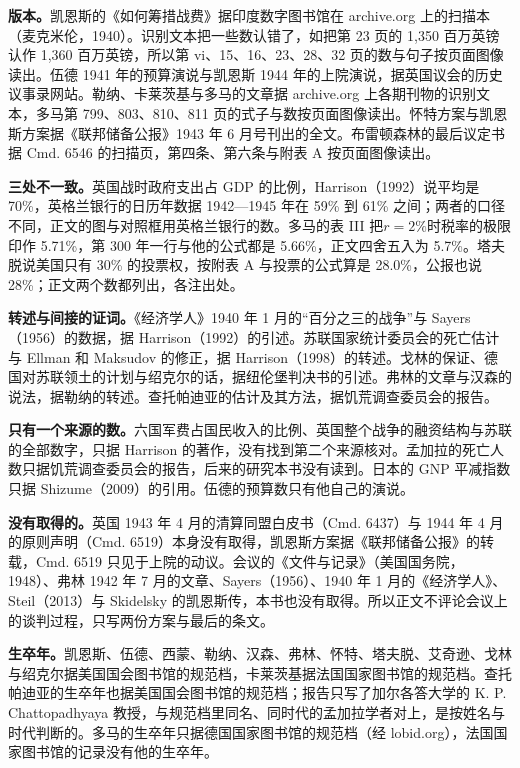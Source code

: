 \begin{deeper}[史料说明]
\textbf{版本。}凯恩斯的《如何筹措战费》据印度数字图书馆在 archive.org 上的扫描本（麦克米伦，1940）。识别文本把一些数认错了，如把第 23 页的 1,350 百万英镑认作 1,360 百万英镑，所以第 vi、15、16、23、28、32 页的数与句子按页面图像读出。伍德 1941 年的预算演说与凯恩斯 1944 年的上院演说，据英国议会的历史议事录网站。勒纳、卡莱茨基与多马的文章据 archive.org 上各期刊物的识别文本，多马第 799、803、810、811 页的式子与数按页面图像读出。怀特方案与凯恩斯方案据《联邦储备公报》1943 年 6 月号刊出的全文。布雷顿森林的最后议定书据 Cmd. 6546 的扫描页，第四条、第六条与附表 A 按页面图像读出。

\textbf{三处不一致。}英国战时政府支出占 GDP 的比例，Harrison（1992）说平均是 70\%，英格兰银行的日历年数据 1942—1945 年在 59\% 到 61\% 之间；两者的口径不同，正文的图与对照框用英格兰银行的数。多马的表 III 把$r=2\%$时税率的极限印作 5.71\%，第 300 年一行与他的公式都是 5.66\%，正文四舍五入为 5.7\%。塔夫脱说美国只有 30\% 的投票权，按附表 A 与投票的公式算是 28.0\%，公报也说 28\%；正文两个数都列出，各注出处。

\textbf{转述与间接的证词。}《经济学人》1940 年 1 月的“百分之三的战争”与 Sayers（1956）的数据，据 Harrison（1992）的引述。苏联国家统计委员会的死亡估计与 Ellman 和 Maksudov 的修正，据 Harrison（1998）的转述。戈林的保证、德国对苏联领土的计划与绍克尔的话，据纽伦堡判决书的引述。弗林的文章与汉森的说法，据勒纳的转述。查托帕迪亚的估计及其方法，据饥荒调查委员会的报告。

\textbf{只有一个来源的数。}六国军费占国民收入的比例、英国整个战争的融资结构与苏联的全部数字，只据 Harrison 的著作，没有找到第二个来源核对。孟加拉的死亡人数只据饥荒调查委员会的报告，后来的研究本书没有读到。日本的 GNP 平减指数只据 Shizume（2009）的引用。伍德的预算数只有他自己的演说。

\textbf{没有取得的。}英国 1943 年 4 月的清算同盟白皮书（Cmd. 6437）与 1944 年 4 月的原则声明（Cmd. 6519）本身没有取得，凯恩斯方案据《联邦储备公报》的转载，Cmd. 6519 只见于上院的动议。会议的《文件与记录》（美国国务院，1948）、弗林 1942 年 7 月的文章、Sayers（1956）、1940 年 1 月的《经济学人》、Steil（2013）与 Skidelsky 的凯恩斯传，本书也没有取得。所以正文不评论会议上的谈判过程，只写两份方案与最后的条文。

\textbf{生卒年。}凯恩斯、伍德、西蒙、勒纳、汉森、弗林、怀特、塔夫脱、艾奇逊、戈林与绍克尔据美国国会图书馆的规范档，卡莱茨基据法国国家图书馆的规范档。查托帕迪亚的生卒年也据美国国会图书馆的规范档；报告只写了加尔各答大学的 K. P. Chattopadhyaya 教授，与规范档里同名、同时代的孟加拉学者对上，是按姓名与时代判断的。多马的生卒年只据德国国家图书馆的规范档（经 lobid.org），法国国家图书馆的记录没有他的生卒年。
\end{deeper}

